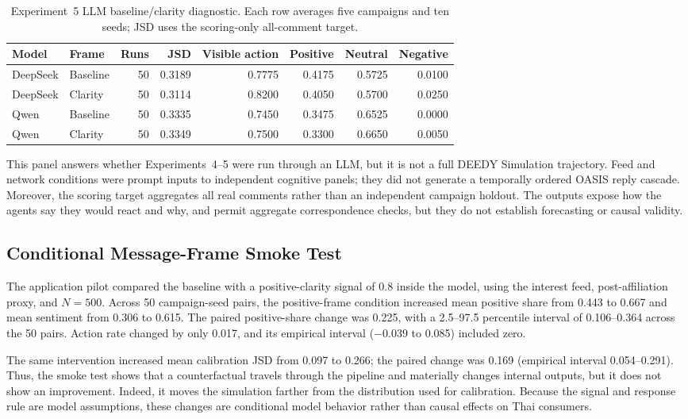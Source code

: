 \documentclass[conference]{IEEEtran}
\begin{document}
\begin{table}[t]
\caption{Experiment~5 LLM baseline/clarity diagnostic. Each row averages five
campaigns and ten seeds; JSD uses the scoring-only all-comment target.}
\label{tab:llm-exp5}
\centering
\footnotesize
\begin{tabular}{@{}llrrrrrr@{}}
\toprule
Model & Frame & Runs & JSD & Visible action & Positive & Neutral & Negative \\
\midrule
DeepSeek & Baseline & 50 & 0.3189 & 0.7775 & 0.4175 & 0.5725 & 0.0100 \\
DeepSeek & Clarity & 50 & 0.3114 & 0.8200 & 0.4050 & 0.5700 & 0.0250 \\
Qwen & Baseline & 50 & 0.3335 & 0.7450 & 0.3475 & 0.6525 & 0.0000 \\
Qwen & Clarity & 50 & 0.3349 & 0.7500 & 0.3300 & 0.6650 & 0.0050 \\
\bottomrule
\end{tabular}
\end{table}

This panel answers whether Experiments~4--5 were run through an LLM, but it is
not a full DEEDY Simulation trajectory. Feed and network conditions were prompt
inputs to independent cognitive panels; they did not generate a temporally
ordered OASIS reply cascade. Moreover, the scoring target aggregates all real
comments rather than an independent campaign holdout. The outputs expose how
the agents say they would react and why, and permit aggregate correspondence
checks, but they do not establish forecasting or causal validity.

\subsection{Conditional Message-Frame Smoke Test}

The application pilot compared the baseline with a positive-clarity signal of
0.8 inside the model, using the interest feed, post-affiliation proxy, and
$N=500$. Across 50 campaign-seed pairs, the positive-frame condition increased
mean positive share from 0.443 to 0.667 and mean sentiment from 0.306 to 0.615.
The paired positive-share change was 0.225, with a 2.5--97.5 percentile interval
of 0.106--0.364 across the 50 pairs. Action rate changed by only 0.017, and its
empirical interval ($-0.039$ to 0.085) included zero.

The same intervention increased mean calibration JSD from 0.097 to 0.266; the
paired change was 0.169 (empirical interval 0.054--0.291). Thus, the smoke test
shows that a counterfactual travels through the pipeline and materially changes
internal outputs, but it does not show an improvement. Indeed, it moves the
simulation farther from the distribution used for calibration. Because the
signal and response rule are model assumptions, these changes are conditional
model behavior rather than causal effects on Thai consumers.
\end{document}
